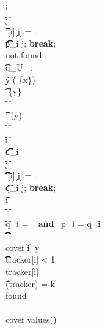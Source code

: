 \begin{figure*}[h]
\begin{pchstack}[boxed,center,space=0.5em]
{%
			\pcfor i \in [k] \\
			\t \pcfor  j \in [m]\\
			\t \t \pcif \repr'[i][j].\fp \not= \repr[i][j].\fp\\
			\t \t \t  p_i \gets j; \textbf{break};\\
			\hspace{-.5em}
			\pcwhile \textrm{not found}\\
			\t \pcif q_U \ \UPO{}:\pcreturn \emptyset\\
			\t y \getsr {}\setminus ( \cup \{x\})\\
			\t \set{I} \gets {} \cup \{y\}\\
			\t  \repr \gets \repr'\\
			\t \repr' \gets \UPO(y) \\
			\t {}\\
			\t \pcfor i \in [k] \\
			\t \t q_i \gets {}\\
			\t \t \pcfor  j \in [m]\\
			\t \t \t \pcif \repr'[i][j].\fp \not= \repr[i][j].\fp\\
			\t \t \t  \t q_i \gets j; \textbf{break};\\
			\t \pcfor i \in [k]\\
			\t \t {}\\
			\t \t \pcif q_i \not=  \ \textbf{ and } \ p_i = q_i\\
			\t \t \t {}\\
			\t \t \t \textrm{cover}[i] \gets y\\
			\t \t \t \pcif \textrm{tracker}[i] < 1\\
			\t \t \t \t  \textrm{tracker}[i] \\
			\t \pcif {}(\textrm{tracker}) = k\\
			\t \t \textrm{found} \gets {}\\
			\\
			\pcreturn \textrm{cover.values()} \  
		}
	\end{pchstack}

\end{figure*}

